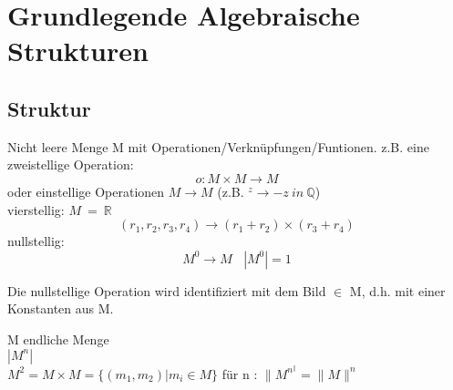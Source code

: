 \documentclass{article}
\begin{document}
  \section{Grundlegende Algebraische Strukturen}
    \subsection{Struktur}
      Nicht leere Menge M mit Operationen/Verknüpfungen/Funtionen. z.B. eine zweistellige Operation:
      \begin{equation}
        o: M \times M \rightarrow M
      \end{equation}
      oder einstellige Operationen $M \rightarrow M$ (z.B. $^z \rightarrow -z\ in\ \mathbb{Q}$)
      \\
      vierstellig: $M\ =\ \mathbb{R}$
      \begin{equation}
        (r_1, r_2, r_3, r_4) \rightarrow (r_1 + r_2) \times (r_3 + r_4)
      \end{equation}
      nullstellig:
      \begin{equation}
        M^0 \rightarrow M\ \ \ \ |M^0| = 1
      \end{equation}

      Die nullstellige Operation wird identifiziert mit dem Bild $\in$ M, d.h. mit einer Konstanten aus M.

      M endliche Menge\\
      $|M^n|$\\
      $M^2 = M \times M = \{(m_1, m_2) | m_i \in M\}$ für n  : $\|M^n^\| = \|M\|^n$\\
\end{document}
